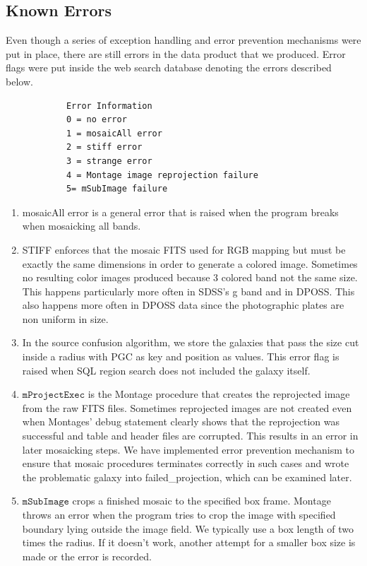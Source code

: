 \documentclass[5p]{elsarticle}
\begin{document}
	\subsection{Known Errors}
	Even though a series of exception handling and error prevention mechanisms were put in place,  there are still errors in the data product that we produced. Error flags were put inside the web search database denoting the errors described below.
	\begin{verbatim}
			Error Information
			0 = no error
			1 = mosaicAll error
			2 = stiff error 
			3 = strange error
			4 = Montage image reprojection failure
			5= mSubImage failure
	\end{verbatim}
	 	\begin{enumerate}
	 	\item  mosaicAll error is a general error that is raised when the program breaks when mosaicking all bands.
	 	\item  STIFF  enforces that the mosaic FITS used for RGB mapping but must be exactly the same dimensions in order to generate a colored image. Sometimes no resulting color images produced because 3 colored band not the same size. This happens particularly more often in SDSS's g band and in DPOSS. %
This also happens more often in DPOSS data since the photographic plates are non uniform in size. 
	 	\item  In the source confusion algorithm, we store the galaxies that pass the size cut inside a radius with PGC as key and position as values. This error flag is raised when SQL region search does not included the galaxy itself. 
	 	\item  $\texttt{mProjectExec}$ is the Montage procedure that creates the reprojected image from the raw FITS files. Sometimes reprojected images are not created even when Montages' debug statement clearly shows that the reprojection was successful and table and header files are corrupted. This results in an error in later mosaicking steps. We have implemented error prevention mechanism to ensure that mosaic procedures terminates correctly in such cases and wrote the problematic galaxy into failed\_projection, which can be examined later. 
	 	\item  $\texttt{mSubImage}$ crops a finished mosaic to the specified box frame. Montage throws an error when the program tries to crop the image with specified boundary lying outside the image field. We typically use a box length of two times the radius. If it doesn't work, another attempt for a smaller box size is made or the error is recorded. 
	 	\end{enumerate}	 
\end{document}
